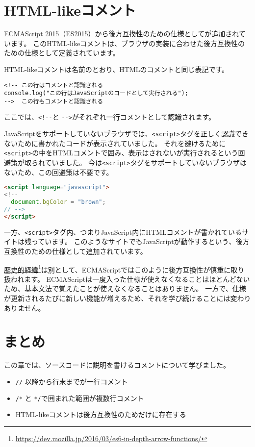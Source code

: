 \hypertarget{html-like-comment}{%
\section[HTML-likeコメント]{HTML-likeコメント\,\protect{}}\label{html-like-comment}}

ECMAScript
2015（ES2015）から後方互換性のための仕様として\textbf{}が追加されています。
このHTML-likeコメントは、ブラウザの実装に合わせた後方互換性のための仕様として定義されています。

HTML-likeコメントは名前のとおり、HTMLのコメントと同じ表記です。

\begin{lstlisting}
<!-- この行はコメントと認識される
console.log("この行はJavaScriptのコードとして実行される");
-->  この行もコメントと認識される
\end{lstlisting}

ここでは、\verb|<!--|と
\verb|-->|がそれぞれ一行コメントとして認識されます。

JavaScriptをサポートしていないブラウザでは、\texttt{<script>}タグを正しく認識できないために書かれたコードが表示されていました。
それを避けるために\texttt{<script>}の中をHTMLコメントで囲み、表示はされないが実行されるという回避策が取られていました。
今は\texttt{<script>}タグをサポートしていないブラウザはないため、この回避策は不要です。

\begin{lstlisting}[language=HTML]
<script language="javascript">
<!--
  document.bgColor = "brown";
// -->
</script>
\end{lstlisting}

一方、\texttt{<script>}タグ内、つまりJavaScript内にHTMLコメントが書かれているサイトは残っています。
このようなサイトでもJavaScriptが動作するという、後方互換性のための仕様として追加されています。

\href{https://dev.mozilla.jp/2016/03/es6-in-depth-arrow-functions/}{歴史的経緯}\footnote{\url{https://dev.mozilla.jp/2016/03/es6-in-depth-arrow-functions/}}は別として、ECMAScriptではこのように後方互換性が慎重に取り扱われます。
ECMAScriptは一度入った仕様が使えなくなることはほとんどないため、基本文法で覚えたことが使えなくなることはありません。
一方で、仕様が更新されるたびに新しい機能が増えるため、それを学び続けることには変わりありません。

\hypertarget{conclusion}{%
\section{まとめ}\label{conclusion}}

この章では、ソースコードに説明を書けるコメントについて学びました。

\begin{itemize}
\item
  \texttt{//} 以降から行末までが一行コメント
\item
  \texttt{/*} と
  \texttt{*/}で囲まれた範囲が複数行コメント
\item
  HTML-likeコメントは後方互換性のためだけに存在する
\end{itemize}
